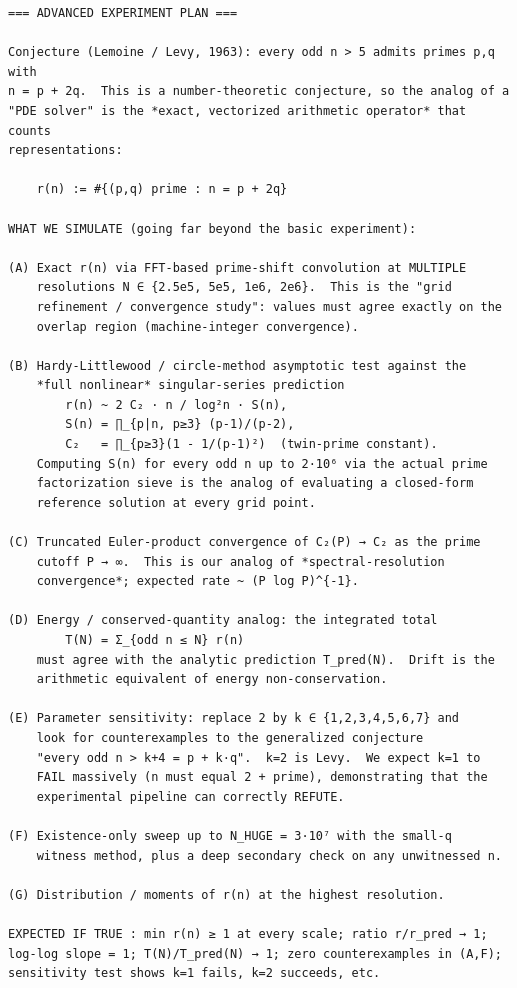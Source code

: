 \documentclass[11pt]{article}
\begin{document}
\begin{lstlisting}
=== ADVANCED EXPERIMENT PLAN ===

Conjecture (Lemoine / Levy, 1963): every odd n > 5 admits primes p,q with
n = p + 2q.  This is a number-theoretic conjecture, so the analog of a
"PDE solver" is the *exact, vectorized arithmetic operator* that counts
representations:

    r(n) := #{(p,q) prime : n = p + 2q}

WHAT WE SIMULATE (going far beyond the basic experiment):

(A) Exact r(n) via FFT-based prime-shift convolution at MULTIPLE
    resolutions N ∈ {2.5e5, 5e5, 1e6, 2e6}.  This is the "grid
    refinement / convergence study": values must agree exactly on the
    overlap region (machine-integer convergence).

(B) Hardy-Littlewood / circle-method asymptotic test against the
    *full nonlinear* singular-series prediction
        r(n) ~ 2 C₂ · n / log²n · S(n),
        S(n) = ∏_{p|n, p≥3} (p-1)/(p-2),
        C₂   = ∏_{p≥3}(1 - 1/(p-1)²)  (twin-prime constant).
    Computing S(n) for every odd n up to 2·10⁶ via the actual prime
    factorization sieve is the analog of evaluating a closed-form
    reference solution at every grid point.

(C) Truncated Euler-product convergence of C₂(P) → C₂ as the prime
    cutoff P → ∞.  This is our analog of *spectral-resolution
    convergence*; expected rate ~ (P log P)^{-1}.

(D) Energy / conserved-quantity analog: the integrated total
        T(N) = Σ_{odd n ≤ N} r(n)
    must agree with the analytic prediction T_pred(N).  Drift is the
    arithmetic equivalent of energy non-conservation.

(E) Parameter sensitivity: replace 2 by k ∈ {1,2,3,4,5,6,7} and
    look for counterexamples to the generalized conjecture
    "every odd n > k+4 = p + k·q".  k=2 is Levy.  We expect k=1 to
    FAIL massively (n must equal 2 + prime), demonstrating that the
    experimental pipeline can correctly REFUTE.

(F) Existence-only sweep up to N_HUGE = 3·10⁷ with the small-q
    witness method, plus a deep secondary check on any unwitnessed n.

(G) Distribution / moments of r(n) at the highest resolution.

EXPECTED IF TRUE : min r(n) ≥ 1 at every scale; ratio r/r_pred → 1;
log-log slope = 1; T(N)/T_pred(N) → 1; zero counterexamples in (A,F);
sensitivity test shows k=1 fails, k=2 succeeds, etc.


\end{lstlisting}
\end{document}
